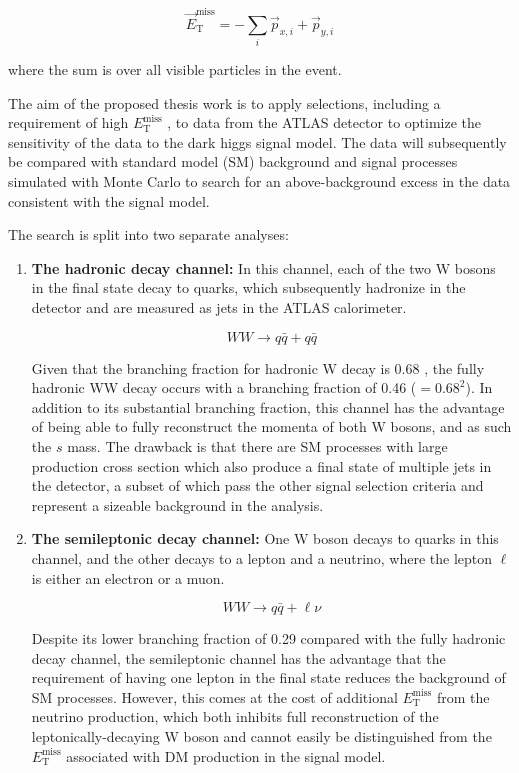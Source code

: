 \documentclass[12pt]{article}
\newcommand*{\met}{\ensuremath{E_\text{T}^\text{miss}} }
\newcommand*{\metvec}{\ensuremath{\vec{E}_\text{T}^\text{miss}} }
\begin{document}
\begin{equation}
\metvec = -\sum_i \vec{p}_{x, i} + \vec{p}_{y, i}
\end{equation}

\noindent where the sum is over all visible particles in the event.

The aim of the proposed thesis work is to apply selections, including a requirement of high \met, to data from the ATLAS detector to optimize the sensitivity of the data to the dark higgs signal model. The data will subsequently be compared with standard model (SM) background and signal processes simulated with Monte Carlo to search for an above-background excess in the data consistent with the signal model. 

The search is split into two separate analyses:

\begin{enumerate}

\item \textbf{The hadronic decay channel:} In this channel, each of the two W bosons in the final state decay to quarks, which subsequently hadronize in the detector and are measured as jets in the ATLAS calorimeter.

\begin{equation}
\nonumber
WW \rightarrow q\bar{q}+q\bar{q}
\end{equation}

Given that the branching fraction for hadronic W decay is 0.68 \cite{PDG}, the fully hadronic WW decay occurs with a branching fraction of 0.46 ($=0.68^2$). In addition to its substantial branching fraction, this channel has the advantage of being able to fully reconstruct the momenta of both W bosons, and as such the $s$ mass. The drawback is that there are SM processes with large production cross section which also produce a final state of multiple jets in the detector, a subset of which pass the other signal selection criteria and represent a sizeable background in the analysis. 

\item \textbf{The semileptonic decay channel:} One W boson decays to quarks in this channel, and the other decays to a lepton and a neutrino, where the lepton $\ell$ is either an electron or a muon. 

\begin{equation}
\nonumber
WW \rightarrow q\bar{q}+\ell\nu
\end{equation}

Despite its lower branching fraction of 0.29 \cite{PDG} compared with the fully hadronic decay channel, the semileptonic channel has the advantage that the requirement of having one lepton in the final state reduces the background of SM processes. However, this comes at the cost of additional \met from the neutrino production, which both inhibits full reconstruction of the leptonically-decaying W boson and cannot easily be distinguished from the \met associated with DM production in the signal model. 

\end{enumerate}
\end{document}
